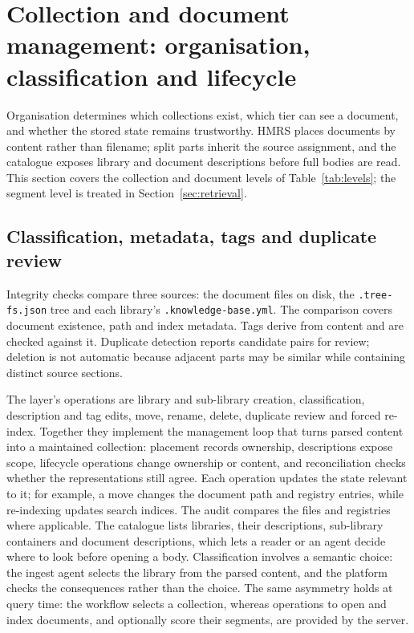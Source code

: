 \section{Collection and document management: organisation, classification and
lifecycle}
\label{sec:organization}

Organisation determines which collections exist, which tier can see a
document, and whether the stored state remains trustworthy. HMRS places
documents by content rather than filename; split parts inherit the source
assignment, and the catalogue exposes library and document descriptions
before full bodies are read. This section covers the collection and document
levels of Table~\ref{tab:levels}; the segment level is treated in
Section~\ref{sec:retrieval}.

\subsection{Classification, metadata, tags and duplicate review}
\label{sec:org-placement}
\label{sec:org-registries}
\label{sec:org-tags}
\label{sec:org-dedup}

Integrity checks compare three sources: the document files on disk, the
\texttt{.tree-fs.json} tree and each library's \texttt{.knowledge-base.yml}.
The comparison covers document existence, path and index metadata. Tags derive
from content and are checked against it.
Duplicate detection reports candidate pairs for review; deletion is not
automatic because adjacent parts may be similar while containing distinct
source sections.

The layer's operations are library and sub-library creation, classification,
description and tag edits, move, rename, delete, duplicate review and forced
re-index. Together they implement the management loop that turns parsed content
into a maintained collection: placement records ownership, descriptions expose
scope, lifecycle operations change ownership or content, and reconciliation
checks whether the representations still agree. Each operation updates the
state relevant to it; for example, a move changes the document path and
registry entries, while re-indexing updates search indices. The audit compares
the files and registries where applicable. The catalogue lists libraries, their
descriptions, sub-library containers and document descriptions, which lets a
reader or an agent decide where to look before opening a body. Classification
involves a semantic choice: the ingest agent
selects the library from the parsed content, and the platform checks the
consequences rather than the choice. The same asymmetry holds at query time: the workflow selects a collection,
whereas operations to open and index documents, and optionally score their
segments, are provided by the server.

